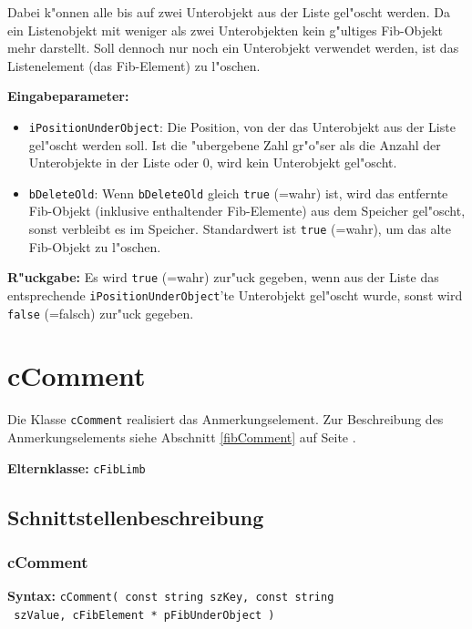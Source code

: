 Dabei k"onnen alle bis auf zwei Unterobjekt aus der Liste gel"oscht werden. Da ein Listenobjekt mit weniger als zwei Unterobjekten kein g"ultiges Fib-Objekt mehr darstellt. Soll dennoch nur noch ein Unterobjekt verwendet werden, ist das Listenelement (das Fib-Element) zu l"oschen.

\bigskip\noindent
\textbf{Eingabeparameter:} 
\begin{itemize}
 \item \verb|iPositionUnderObject|: Die Position, von der das Unterobjekt aus der Liste gel"oscht werden soll. Ist die "ubergebene Zahl gr"o"ser als die Anzahl der Unterobjekte in der Liste oder $0$, wird kein Unterobjekt gel"oscht.
 \item \verb|bDeleteOld|: Wenn \verb|bDeleteOld| gleich \verb|true| (=wahr) ist, wird das entfernte Fib-Objekt (inklusive enthaltender Fib-Elemente) aus dem Speicher gel"oscht, sonst verbleibt es im Speicher. Standardwert ist \verb|true| (=wahr), um das alte Fib-Objekt zu l"oschen.

\end{itemize}

\bigskip\noindent
\textbf{R"uckgabe:} Es wird \verb|true| (=wahr) zur"uck gegeben, wenn aus der Liste das entsprechende \verb|iPositionUnderObject|'te Unterobjekt gel"oscht wurde, sonst wird \verb|false| (=falsch) zur"uck gegeben.


\section{cComment}

Die Klasse \verb|cComment| realisiert das Anmerkungselement.
Zur Beschreibung des Anmerkungselements siehe Abschnitt \ref{fibComment} auf Seite \pageref{fibComment} .

\bigskip\noindent
\textbf{Elternklasse:} \verb|cFibLimb|


\subsection{Schnittstellenbeschreibung}

\subsubsection{cComment}

\textbf{Syntax:} \verb|cComment( const string szKey, const string| \\\verb| szValue, cFibElement * pFibUnderObject )|

